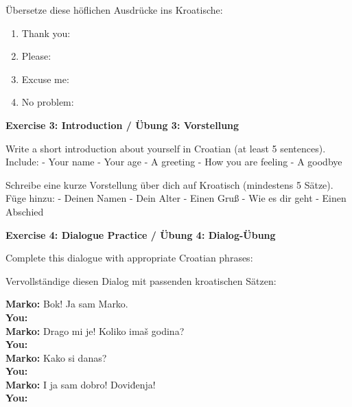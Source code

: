 \begin{exercise}
Übersetze diese höflichen Ausdrücke ins Kroatische:

\begin{enumerate}
    \item Thank you: \underline{\hspace{5cm}}
    \item Please: \underline{\hspace{5cm}}
    \item Excuse me: \underline{\hspace{5cm}}
    \item No problem: \underline{\hspace{5cm}}
\end{enumerate}

\vspace{2cm}

\textbf{Exercise 3: Introduction / Übung 3: Vorstellung}

Write a short introduction about yourself in Croatian (at least 5 sentences). Include:
- Your name
- Your age
- A greeting
- How you are feeling
- A goodbye

Schreibe eine kurze Vorstellung über dich auf Kroatisch (mindestens 5 Sätze). Füge hinzu:
- Deinen Namen
- Dein Alter
- Einen Gruß
- Wie es dir geht
- Einen Abschied

\vspace{5cm}

\textbf{Exercise 4: Dialogue Practice / Übung 4: Dialog-Übung}

Complete this dialogue with appropriate Croatian phrases:

Vervollständige diesen Dialog mit passenden kroatischen Sätzen:

\textbf{Marko:} Bok! Ja sam Marko. \\
\textbf{You:} \underline{\hspace{8cm}} \\
\textbf{Marko:} Drago mi je! Koliko imaš godina? \\
\textbf{You:} \underline{\hspace{8cm}} \\
\textbf{Marko:} Kako si danas? \\
\textbf{You:} \underline{\hspace{8cm}} \\
\textbf{Marko:} I ja sam dobro! Doviđenja! \\
\textbf{You:} \underline{\hspace{8cm}}

\vspace{2cm}


\end{exercise}
